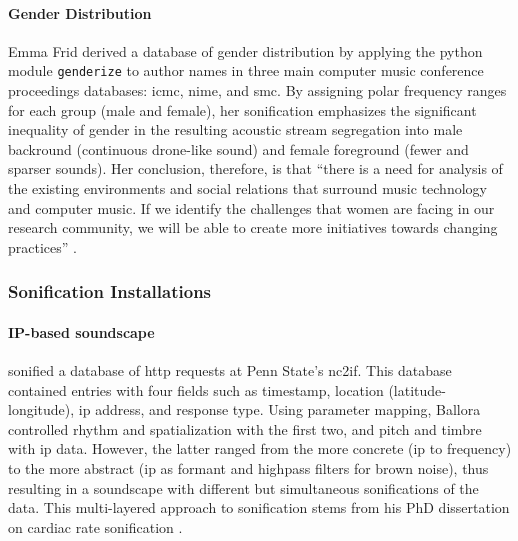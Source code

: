 \paragraph{Gender Distribution}
Emma Frid \parencite{Fri17:Son} derived a database of gender distribution by applying the python module \texttt{genderize} to author names in three main computer music conference proceedings databases: \gls{icmc}, \gls{nime}, and \gls{smc}. By assigning polar frequency ranges for each group (male and female), her sonification emphasizes the significant inequality of gender in the resulting acoustic stream segregation into male backround (continuous drone-like sound) and female foreground (fewer and sparser sounds). Her conclusion, therefore, is that ``there is a need for analysis of the existing environments and social relations that surround music technology and computer music. If we identify the challenges that women are facing in our research community, we will be able to create more initiatives towards changing practices'' \parencite[238]{Fri17:Son}.

\subsubsection{Sonification Installations}
\label{sonification:installations}

% 
% 

\paragraph{IP-based soundscape}
\cite{icmc/bbp2372.2010.117} sonified a database of \gls{http} requests at Penn State's \gls{nc2if}. This database contained entries with four fields such as timestamp, location (latitude-longitude), \gls{ip} address, and response type. Using parameter mapping, Ballora controlled rhythm and spatialization with the first two, and pitch and timbre with \gls{ip} data. However, the latter ranged from the more concrete (\gls{ip} to frequency) to the more abstract (\gls{ip} as formant and highpass filters for brown noise), thus resulting in a soundscape with different but simultaneous sonifications of the data. This multi-layered approach to sonification stems from his PhD dissertation on cardiac rate sonification \parencite{Ballora/2000/phdthesis}.

